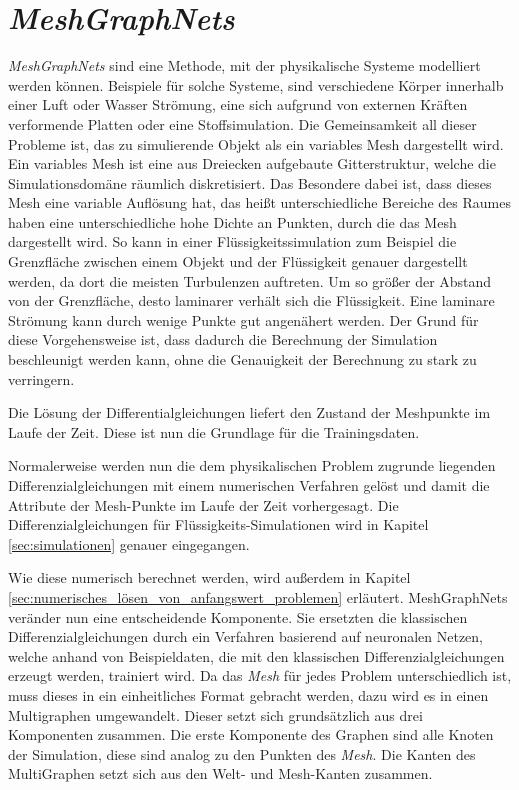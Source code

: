

\section{\textit{MeshGraphNets}} \label{sec:meshgraphnets}

\textit{MeshGraphNets} \cite{meshgraphnets} sind eine Methode, mit der physikalische Systeme modelliert werden können.
Beispiele für solche Systeme, sind verschiedene Körper innerhalb einer Luft oder Wasser Strömung, eine 
sich aufgrund von externen Kräften verformende Platten oder eine Stoffsimulation.
Die Gemeinsamkeit all dieser Probleme ist, das zu simulierende Objekt als ein variables Mesh dargestellt wird.
Ein variables Mesh ist eine aus Dreiecken aufgebaute Gitterstruktur, welche die Simulationsdomäne räumlich diskretisiert.
Das Besondere dabei ist, dass dieses Mesh eine variable Auflösung hat, das heißt unterschiedliche Bereiche des Raumes 
haben eine unterschiedliche hohe Dichte an Punkten, durch die das Mesh dargestellt wird.
So kann in einer Flüssigkeitssimulation zum Beispiel die Grenzfläche zwischen einem Objekt und der Flüssigkeit
genauer dargestellt werden, da dort die meisten Turbulenzen auftreten.
Um so größer der Abstand von der Grenzfläche, desto laminarer verhält sich die Flüssigkeit.
Eine laminare Strömung kann durch wenige Punkte gut angenähert werden.
Der Grund für diese Vorgehensweise ist, dass dadurch die Berechnung der Simulation beschleunigt werden kann,
ohne die Genauigkeit der Berechnung zu stark zu verringern.

Die Lösung der Differentialgleichungen liefert den Zustand der Meshpunkte im Laufe der Zeit.
Diese ist nun die Grundlage für die Trainingsdaten.

Normalerweise werden nun die dem physikalischen Problem zugrunde liegenden Differenzialgleichungen mit einem numerischen Verfahren gelöst 
und damit die Attribute der Mesh-Punkte im Laufe der Zeit vorhergesagt.
Die Differenzialgleichungen für Flüssigkeits-Simulationen wird in Kapitel \ref{sec:simulationen} genauer eingegangen.


Wie diese numerisch berechnet werden, wird außerdem in Kapitel \ref{sec:numerisches_lösen_von_anfangswert_problemen} erläutert.
Mesh\-Graph\-Nets veränder nun eine entscheidende Komponente.
Sie ersetzten die klassischen Differenzialgleichungen durch ein Verfahren basierend auf neuronalen Netzen,
welche anhand von Beispieldaten, die mit den klassischen Differenzialgleichungen erzeugt werden, trainiert wird.
Da das \textit{Mesh} für jedes Problem unterschiedlich ist, muss dieses in ein einheitliches Format gebracht werden, dazu wird es in einen
Multigraphen umgewandelt.
Dieser setzt sich grundsätzlich aus drei Komponenten zusammen.
Die erste Komponente des Graphen sind alle Knoten der Simulation, diese sind analog zu den Punkten des \textit{Mesh}.
Die Kanten des MultiGraphen setzt sich aus den Welt- und Mesh-Kanten zusammen.

